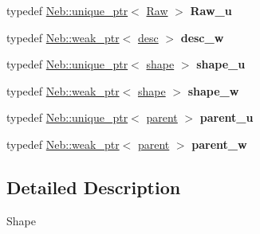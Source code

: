 \begin{DoxyCompactItemize}
\item 
\hypertarget{namespaceNeb_1_1Shape_ae537126626235a0f7b709b7deac402b9}{typedef \hyperlink{classNeb_1_1unique__ptr}{\-Neb\-::unique\-\_\-ptr}$<$ \hyperlink{classNeb_1_1Shape_1_1Raw}{\-Raw} $>$ {\bfseries \-Raw\-\_\-u}}\label{namespaceNeb_1_1Shape_ae537126626235a0f7b709b7deac402b9}

\item 
\hypertarget{namespaceNeb_1_1Shape_a74bd1678acb4029421763c7ad829e174}{typedef \hyperlink{classNeb_1_1weak__ptr}{\-Neb\-::weak\-\_\-ptr}$<$ \hyperlink{classNeb_1_1Shape_1_1desc}{desc} $>$ {\bfseries desc\-\_\-w}}\label{namespaceNeb_1_1Shape_a74bd1678acb4029421763c7ad829e174}

\item 
\hypertarget{namespaceNeb_1_1Shape_a3401af574b843fe67798c446e4f55dd8}{typedef \hyperlink{classNeb_1_1unique__ptr}{\-Neb\-::unique\-\_\-ptr}$<$ \hyperlink{classNeb_1_1Shape_1_1shape}{shape} $>$ {\bfseries shape\-\_\-u}}\label{namespaceNeb_1_1Shape_a3401af574b843fe67798c446e4f55dd8}

\item 
\hypertarget{namespaceNeb_1_1Shape_a73822282be2f02b499b9ea4d036561fb}{typedef \hyperlink{classNeb_1_1weak__ptr}{\-Neb\-::weak\-\_\-ptr}$<$ \hyperlink{classNeb_1_1Shape_1_1shape}{shape} $>$ {\bfseries shape\-\_\-w}}\label{namespaceNeb_1_1Shape_a73822282be2f02b499b9ea4d036561fb}

\item 
\hypertarget{namespaceNeb_1_1Shape_a7a1baca55d0c6ec7ea60b69fcd110652}{typedef \hyperlink{classNeb_1_1unique__ptr}{\-Neb\-::unique\-\_\-ptr}$<$ \hyperlink{classNeb_1_1Shape_1_1parent}{parent} $>$ {\bfseries parent\-\_\-u}}\label{namespaceNeb_1_1Shape_a7a1baca55d0c6ec7ea60b69fcd110652}

\item 
\hypertarget{namespaceNeb_1_1Shape_ace80b8e9cfedc417649b5d4017f814b9}{typedef \hyperlink{classNeb_1_1weak__ptr}{\-Neb\-::weak\-\_\-ptr}$<$ \hyperlink{classNeb_1_1Shape_1_1parent}{parent} $>$ {\bfseries parent\-\_\-w}}\label{namespaceNeb_1_1Shape_ace80b8e9cfedc417649b5d4017f814b9}

\end{DoxyCompactItemize}


\subsection{\-Detailed \-Description}
\-Shape 